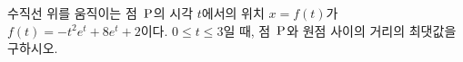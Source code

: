 수직선 위를 움직이는 점~$\mathrm{P}$의 시각 $t$에서의 위치 $x=f(t)$가 $f(t)=-t^2e^t+8e^t+2$이다. $0\le t\le 3$일 때, 점~$\mathrm{P}$와 원점 사이의 거리의 최댓값을 구하시오.
